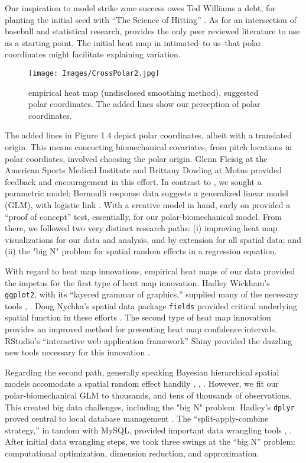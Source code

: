 Our inspiration to model strike zone success owes Ted Williams a debt, for planting the initial seed with ``The Science of Hitting'' \citep{Williams1971}. As for an intersection of baseball and statistical research, \cite{Cross2015} provides the only peer reviewed literature to use as a starting point. The initial heat map in \cite{Cross2015} intimated--to us--that polar coordinates might facilitate explaining variation. 
        \begin{figure}[H]
      	\centering
      	\texttt{[image: Images/CrossPolar2.jpg]} 
      	\caption{\cite{Cross2015} empirical heat map (undisclosed smoothing method), suggested polar coordinates. The added lines show our perception of polar coordinates.}
      	\end{figure}
The added lines in Figure 1.4 depict polar coordinates, albeit with a translated origin. This means concocting biomechanical covariates, from pitch locations in polar coordiates, involved choosing the polar origin. Glenn Fleisig at the American Sports Medical Institute \citep{Fleisig2002} and Brittany Dowling at Motus \citep{Dowling2016} provided feedback and encouragement in this effort. In contrast to \citep{Cross2015}, we sought a parametric model; Bernoulli response data suggests a generalized linear model (GLM), with logistic link \citep{Myers2012}. With a creative model in hand, early on \cite{Hosmer2013} provided a ``proof of concept'' test, essentially, for our polar-biomechanical model. From there, we followed two very distinct research paths: (i) improving heat map visualizations for our data and analysis, and by extension for all spatial data; and (ii) the "big N" problem for spatial random effects in a regression equation.

With regard to heat map innovations, empirical heat maps of our data provided the impetus for the first type of heat map innovation. Hadley Wickham's \verb|ggplot2|, with its ``layered grammar of graphics,'' supplied many of the necessary tools \citep{Wickham2009}, \citep{Wickham2010}. Doug Nychka's spatial data package \verb|fields| provided critical underlying spatial function in these efforts \citep{Nychka}. The second type of heat map innovation provides an improved method for presenting heat map confidence intervals. RStudio's ``interactive web application framework'' Shiny provided the dazzling new tools necessary for this innovation \citep{Shiny}.

Regarding the second path, generally speaking Bayesian hierarchical spatial models accomodate a spatial random effect handily \citep{Gelman2014}, \citep{Banerjee2014}, \citep{Oliver2005}. However, we fit our polar-biomechanical GLM to thousands, and tens of thousands of observations. This created big data challenges, including the "big N" problem. Hadley's \verb|dplyr| proved central to local database management \citep{Wickham2016}. The ``split-apply-combine strategy,'' in tandom with MySQL, provided important data wrangling tools \citep{Wickham2016}, \citep{Tahaghoghi2006}. After initial data wrangling steps, we took three swings at the ``big N'' problem: computational optimization, dimension reduction, and approximation.

